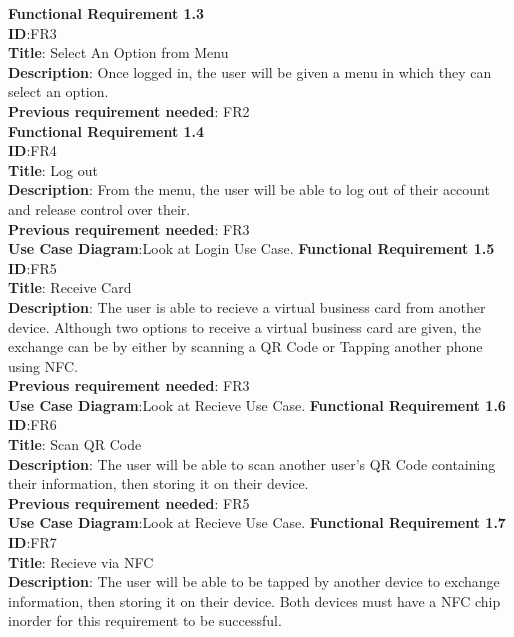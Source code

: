 \documentclass[english]{article}
\begin{document}
				\textbf{Functional Requirement 1.3}\\
				\textbf{ID}:FR3\\
				\textbf{Title}: Select An Option from Menu\\
				\textbf{Description}: Once logged in, the user will be given a menu in which they can select an option.\\
				\textbf{Previous requirement needed}: FR2\\
				
				\textbf{Functional Requirement 1.4}\\
				\textbf{ID}:FR4\\
				\textbf{Title}: Log out\\
				\textbf{Description}: From the menu, the user will be able to log out of their account and release control over their.\\
				\textbf{Previous requirement needed}: FR3\\
				\textbf{Use Case Diagram}:Look at Login Use Case.
				\textbf{Functional Requirement 1.5}\\
				\textbf{ID}:FR5\\
				\textbf{Title}: Receive Card\\
				\textbf{Description}: The user is able to recieve a virtual business card from another device. Although two options to receive a virtual business card are given, the exchange can be by either by scanning a QR Code or Tapping another phone using NFC.\\
				\textbf{Previous requirement needed}: FR3\\
				\textbf{Use Case Diagram}:Look at Recieve Use Case.
				\textbf{Functional Requirement 1.6}\\
				\textbf{ID}:FR6\\
				\textbf{Title}: Scan QR Code\\
				\textbf{Description}: The user will be able to scan another user's QR Code containing their information, then storing it on their device.\\
				\textbf{Previous requirement needed}: FR5\\
				\textbf{Use Case Diagram}:Look at Recieve Use Case.
				\textbf{Functional Requirement 1.7}\\
				\textbf{ID}:FR7\\
				\textbf{Title}: Recieve via NFC\\
				\textbf{Description}: The user will be able to be tapped by another device to exchange information, then storing it on their device. Both devices must have a NFC chip inorder for this requirement to be successful.\\
\end{document}

